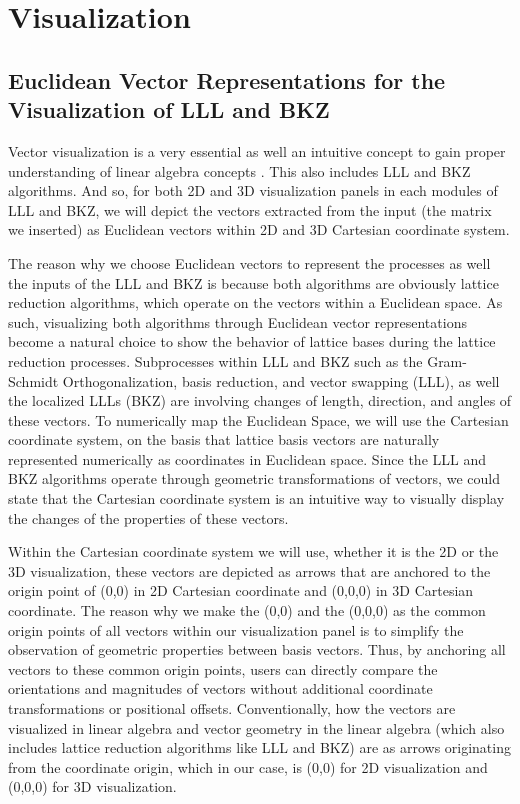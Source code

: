 \documentclass[runningheads]{llncs}
\begin{document}
\section{Visualization}
\subsection{Euclidean Vector Representations for the Visualization of LLL and BKZ}
\mbox{}
Vector visualization is a very essential as well an intuitive concept to gain proper understanding of linear algebra concepts \cite{15}. This also includes LLL and BKZ algorithms. And so, for both 2D and 3D visualization panels in each modules of LLL and BKZ, we will depict the vectors extracted from the input (the matrix we inserted) as Euclidean vectors within 2D and 3D Cartesian coordinate system. 

The reason why we choose Euclidean vectors to represent the processes as well the inputs of the LLL and BKZ is because both algorithms are obviously lattice reduction algorithms, which operate on the vectors within a Euclidean space. As such, visualizing both algorithms through Euclidean vector representations become a natural choice to show the behavior of lattice bases during the lattice reduction processes. Subprocesses within LLL and BKZ such as the Gram-Schmidt Orthogonalization, basis reduction, and vector swapping (LLL), as well the localized LLLs (BKZ) are involving changes of length, direction, and angles of these vectors. To numerically map the Euclidean Space, we will use the Cartesian coordinate system, on the basis that lattice basis vectors are naturally represented numerically as coordinates in Euclidean space. Since the LLL and BKZ algorithms operate through geometric transformations of vectors, we could state that the Cartesian coordinate system is an intuitive way to visually display the changes of the properties of these vectors. 

Within the Cartesian coordinate system we will use, whether it is the 2D or the 3D visualization, these vectors are depicted as arrows that are anchored to the origin point of (0,0) in 2D Cartesian coordinate and (0,0,0) in 3D Cartesian coordinate. The reason why we make the (0,0) and the (0,0,0) as the common origin points of all vectors within our visualization panel is to simplify the observation of geometric properties between basis vectors. Thus, by anchoring all vectors to these common origin points, users can directly compare the orientations and magnitudes of vectors without additional coordinate transformations or positional offsets. Conventionally, how the vectors are visualized in linear algebra and vector geometry in the linear algebra (which also includes lattice reduction algorithms like LLL and BKZ) are as arrows originating from the coordinate origin, which in our case, is (0,0) for 2D visualization and (0,0,0) for 3D visualization. 
\end{document}
